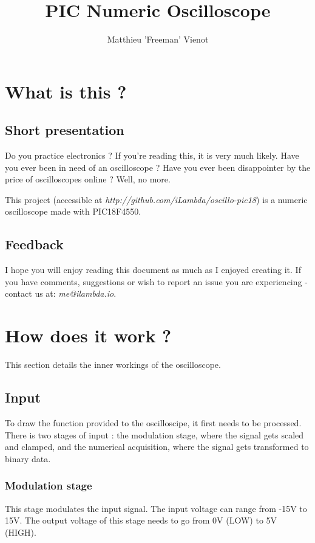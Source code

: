 \documentclass[11pt]{article}
\title{\textbf{PIC Numeric Oscilloscope}}
\author{Matthieu 'Freeman' Vienot}
\date{}
\begin{document}
\maketitle

\section{What is this ?}
\subsection {\Large\bfseries{Short presentation}}
Do you practice electronics ? If you're reading this, it is very much likely. Have you ever been in need of an oscilloscope ? Have you ever been disappointer by the price of oscilloscopes online ? Well, no more.

This project (accessible at \emph{http://github.com/iLambda/oscillo-pic18}) is a numeric oscilloscope made with PIC18F4550.

\subsection{Feedback}
I hope you will enjoy reading this document as much as I enjoyed creating it. If you have comments, suggestions or wish to report an issue you are experiencing - contact us at: \emph{me@ilambda.io}.

\section {How does it work ?}

This section details the inner workings of the oscilloscope.

\subsection{Input}

To draw the function provided to the oscilloscipe, it first needs to be processed. There is two stages of input : the modulation stage, where the signal gets scaled and clamped, and the numerical acquisition, where the signal gets transformed to binary data.

\subsubsection{Modulation stage}

This stage modulates the input signal. The input voltage can range from -15V to 15V. The output voltage of this stage needs to go from 0V (LOW) to 5V (HIGH).
\end{document}
